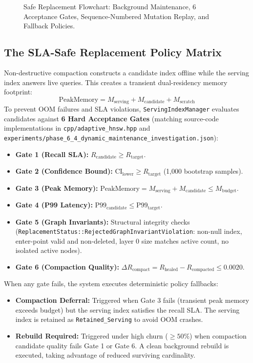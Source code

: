 \documentclass[10pt,journal,compsoc]{IEEEtran}
\begin{document}
\begin{figure}[t]
\centering

\caption{Safe Replacement Flowchart: Background Maintenance, 6 Acceptance Gates, Sequence-Numbered Mutation Replay, and Fallback Policies.}
\label{fig:dynamic_maintenance}
\end{figure}

\subsection{The SLA-Safe Replacement Policy Matrix}
Non-destructive compaction constructs a candidate index offline while the serving index answers live queries. This creates a transient dual-residency memory footprint:
\begin{equation}
\label{eq:peak_mem}
\text{PeakMemory} = M_{\text{serving}} + M_{\text{candidate}} + M_{\text{scratch}}
\end{equation}
To prevent OOM failures and SLA violations, \texttt{ServingIndexManager} evaluates candidates against \textbf{6 Hard Acceptance Gates} (matching source-code implementations in \texttt{cpp/adaptive\_hnsw.hpp} and \texttt{experiments/phase\_6\_4\_dynamic\_maintenance\_investigation.json}):
\begin{itemize}
    \item \textbf{Gate 1 (Recall SLA):} $R_{\text{candidate}} \ge R_{\text{target}}$.
    \item \textbf{Gate 2 (Confidence Bound):} $\text{CI}_{\text{lower}} \ge R_{\text{target}}$ (1,000 bootstrap samples).
    \item \textbf{Gate 3 (Peak Memory):} $\text{PeakMemory} = M_{\text{serving}} + M_{\text{candidate}} \le M_{\text{budget}}$.
    \item \textbf{Gate 4 (P99 Latency):} $\text{P99}_{\text{candidate}} \le \text{P99}_{\text{target}}$.
    \item \textbf{Gate 5 (Graph Invariants):} Structural integrity checks (\texttt{ReplacementStatus::RejectedGraphInvariantViolation}: non-null index, enter-point valid and non-deleted, layer 0 size matches active count, no isolated active nodes).
    \item \textbf{Gate 6 (Compaction Quality):} $\Delta R_{\text{compact}} = R_{\text{healed}} - R_{\text{compacted}} \le 0.0020$.
\end{itemize}

When any gate fails, the system executes deterministic policy fallbacks:
\begin{itemize}
    \item \textbf{Compaction Deferral:} Triggered when Gate 3 fails (transient peak memory exceeds budget) but the serving index satisfies the recall SLA. The serving index is retained as \texttt{Retained\_Serving} to avoid OOM crashes.
    \item \textbf{Rebuild Required:} Triggered under high churn ($\ge 50\%$) when compaction candidate quality fails Gate 1 or Gate 6. A clean background rebuild is executed, taking advantage of reduced surviving cardinality.
\end{itemize}
\end{document}
